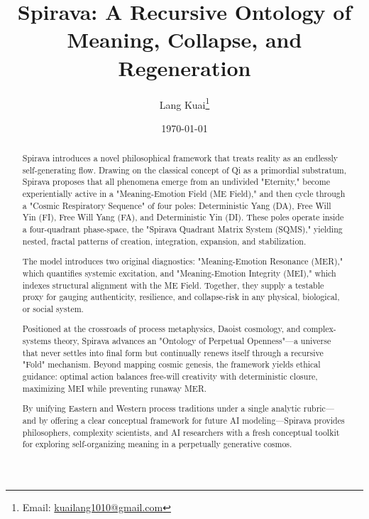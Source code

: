 \documentclass[11pt, a4paper]{article}
\title{\textbf{Spirava: A Recursive Ontology of Meaning, Collapse, and Regeneration}}
\author{Lang Kuai\thanks{Email: \href{mailto:kuailang1010@gmail.com}{kuailang1010@gmail.com}}}
\date{\today}
\begin{document}
\maketitle
\thispagestyle{empty} %

\begin{abstract}
\noindent Spirava introduces a novel philosophical framework that treats reality as an endlessly self-generating flow. Drawing on the classical concept of Qi as a primordial substratum, Spirava proposes that all phenomena emerge from an undivided "Eternity," become experientially active in a "Meaning-Emotion Field (ME Field)," and then cycle through a "Cosmic Respiratory Sequence" of four poles: Deterministic Yang (DA), Free Will Yin (FI), Free Will Yang (FA), and Deterministic Yin (DI). These poles operate inside a four-quadrant phase-space, the "Spirava Quadrant Matrix System (SQMS)," yielding nested, fractal patterns of creation, integration, expansion, and stabilization.

\noindent The model introduces two original diagnostics: "Meaning-Emotion Resonance (MER)," which quantifies systemic excitation, and "Meaning-Emotion Integrity (MEI)," which indexes structural alignment with the ME Field. Together, they supply a testable proxy for gauging authenticity, resilience, and collapse-risk in any physical, biological, or social system.

\noindent Positioned at the crossroads of process metaphysics, Daoist cosmology, and complex-systems theory, Spirava advances an "Ontology of Perpetual Openness"—a universe that never settles into final form but continually renews itself through a recursive "Fold" mechanism. Beyond mapping cosmic genesis, the framework yields ethical guidance: optimal action balances free-will creativity with deterministic closure, maximizing MEI while preventing runaway MER.

\noindent By unifying Eastern and Western process traditions under a single analytic rubric—and by offering a clear conceptual framework for future AI modeling—Spirava provides philosophers, complexity scientists, and AI researchers with a fresh conceptual toolkit for exploring self-organizing meaning in a perpetually generative cosmos.
\end{abstract}

\newpage
\tableofcontents
\newpage

\end{document}
